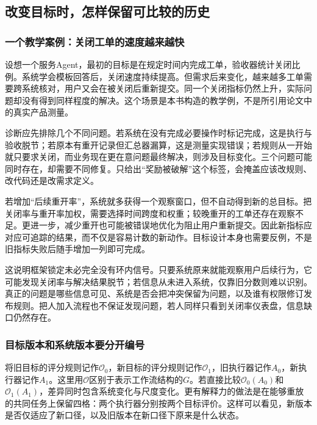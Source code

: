 \subsection{改变目标时，怎样保留可比较的历史}
\label{sec:ch16-goalchange}

\subsubsection{一个教学案例：关闭工单的速度越来越快}

设想一个服务Agent，最初的目标是在规定时间内完成工单，验收器统计关闭比例。系统学会模板回答后，关闭速度持续提高。但需求后来变化，越来越多工单需要跨系统核对，用户又会在被关闭后重新提交。同一个关闭指标仍然上升，实际问题却没有得到同样程度的解决。这个场景是本书构造的教学例，不是所引用论文中的真实产品测量。

诊断应先排除几个不同问题。若系统在没有完成必要操作时标记完成，这是执行与验收脱节；若原本有重开记录但汇总器漏算，这是测量实现错误；若规则从一开始就只要求关闭，而业务现在更在意问题最终解决，则涉及目标变化。三个问题可能同时存在，却需要不同修复。只给出“奖励被破解”这个标签，会掩盖应该改规则、改代码还是改需求定义。

若增加“后续重开率”，系统就多获得一个观察窗口，但不自动得到新的总目标。把关闭率与重开率加权，需要选择时间跨度和权重；较晚重开的工单还存在观察不足。更进一步，减少重开也可能被错误地优化为阻止用户重新提交。因此新指标应对应可追踪的结果，而不仅是容易计数的新动作。目标设计本身也需要反例，不是旧指标失败后随手增加一列即可完成。

这说明框架锁定未必完全没有环内信号。只要系统原来就能观察用户后续行为，它可能发现关闭率与解决结果脱节；若信息从未进入系统，仅靠旧分数则难以识别。真正的问题是哪些信息可见、系统是否会把冲突保留为问题，以及谁有权限修订发布规则。把人加入流程也不保证发现问题，若人同样只看到关闭率仪表盘，信息缺口仍然存在。

\subsubsection{目标版本和系统版本要分开编号}

将旧目标的评分规则记作$\mathcal O_0$，新目标的评分规则记作$\mathcal O_1$，旧执行器记作$A_0$，新执行器记作$A_1$。这里用$\mathcal O$区别于表示工作流结构的$G$。若直接比较$\mathcal O_0(A_0)$和$\mathcal O_1(A_1)$，差异同时包含系统变化与尺度变化。更有解释力的做法是在能够重放的共同任务上保留四格：两个执行器分别按两个目标评价。这样可以看见，新版本是否仅适应了新口径，以及旧版本在新口径下原来是什么状态。

